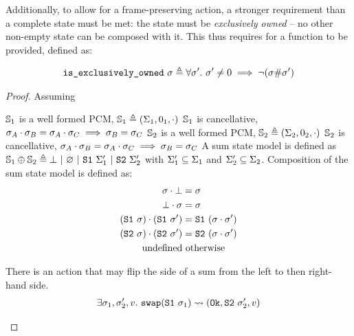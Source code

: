 Additionally, to allow for a frame-preserving \swap{} action, a stronger requirement than a complete state must be met: the state must be \textit{exclusively owned} -- no other non-empty state can be composed with it. This thus requires for a  function to be provided, defined as:

\newcommand{\isexowned}[0]{\code{is\_exclusively\_owned}~}
\begin{align*}
	\isexowned\st \defeq \forall\st'.~\st'\neq0\implies\neg(\st\#\st')
\end{align*}


\begin{proof}

Assuming
\begin{hypvlist}
 $\mathbb S_1$ is a well formed PCM, $\mathbb S_1 \triangleq (\Sigma_1, 0_1, \cdot)$
 $\mathbb S_1$ is cancellative, $\sigma_A \cdot \sigma_B = \sigma_A \cdot \sigma_C \implies \sigma_B = \sigma_C$
 $\mathbb S_2$ is a well formed PCM, $\mathbb S_2 \triangleq (\Sigma_2, 0_2, \cdot)$
 $\mathbb S_2$ is cancellative, $\sigma_A \cdot \sigma_B = \sigma_A \cdot \sigma_C \implies \sigma_B = \sigma_C$
 A sum state model is defined as $\mathbb S_1\oplus\mathbb S_2 \triangleq \bot ~|~ \varnothing ~|~ \texttt{S1}~ \Sigma_1' ~|~ \texttt{S2}~ \Sigma_2'$ with $\Sigma_1'\subseteq \Sigma_1$ and $\Sigma_2'\subseteq \Sigma_2$.
 Composition of the sum state model is defined as:
	\begin{align*}
		\sigma \cdot \bot &= \sigma\\
		\bot \cdot \sigma &= \sigma\\
		(\texttt{S1}~\sigma) \cdot (\texttt{S1}~\sigma') &= \texttt{S1}~(\sigma\cdot\sigma')\\
		(\texttt{S2}~\sigma) \cdot (\texttt{S2}~\sigma') &= \texttt{S2}~(\sigma\cdot\sigma')\\
		\text{undefined}&\text{ otherwise}
	\end{align*}

 There is an action \swap{} that may flip the side of a sum from the left to then right-hand side.
	\begin{align*}
		\exists\sigma_1,\sigma_2',v.~\texttt{swap}(\texttt{S1}~\sigma_1)\rightsquigarrow(\texttt{Ok},\texttt{S2}~\sigma_2',v)
	\end{align*}

\end{hypvlist}


\end{proof}
